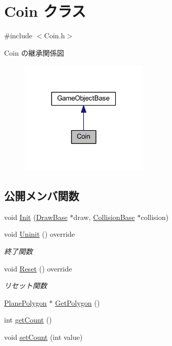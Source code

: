 \hypertarget{class_coin}{}\section{Coin クラス}
\label{class_coin}


{\ttfamily \#include $<$Coin.\+h$>$}



Coin の継承関係図\nopagebreak
\begin{figure}[H]
\begin{center}
\leavevmode
\includegraphics[width=174pt]{class_coin__inherit__graph}
\end{center}
\end{figure}
\subsection*{公開メンバ関数}
\begin{DoxyCompactItemize}
\item 
void \mbox{\hyperlink{class_coin_aecb007762f15ecc91cd6a699e60c2e19}{Init}} (\mbox{\hyperlink{class_draw_base}{Draw\+Base}} $\ast$draw, \mbox{\hyperlink{class_collision_base}{Collision\+Base}} $\ast$collision)
\item 
void \mbox{\hyperlink{class_coin_a4d364dcb4b57b80ea00ce931d0bb300f}{Uninit}} () override
\begin{DoxyCompactList}\small\item\em 終了関数 \end{DoxyCompactList}\item 
void \mbox{\hyperlink{class_coin_a52c50229ce7c1e0f459e198adac70c8d}{Reset}} () override
\begin{DoxyCompactList}\small\item\em リセット関数 \end{DoxyCompactList}\item 
\mbox{\hyperlink{class_plane_polygon}{Plane\+Polygon}} $\ast$ \mbox{\hyperlink{class_coin_af435ca01cc92d7214e7bc94ed486ab7b}{Get\+Polygon}} ()
\item 
int \mbox{\hyperlink{class_coin_a5b302d3ad7be44267e1f4e6a54b0f23c}{get\+Count}} ()
\item 
void \mbox{\hyperlink{class_coin_acb3027a1a45470723b7952c73af69878}{set\+Count}} (int value)
\end{DoxyCompactItemize}
